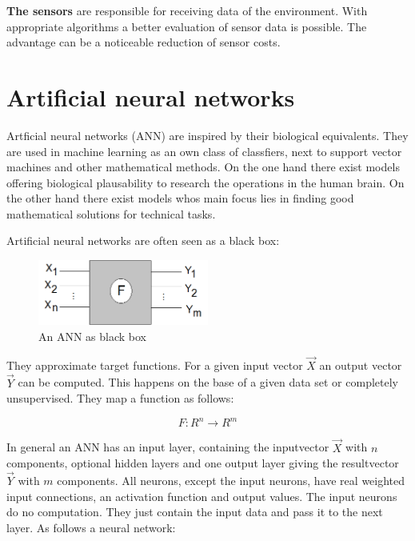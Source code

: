 \documentclass[10pt,a4paper,DIV=11]{scrreprt}
\begin{document}
\textbf{The sensors} are responsible for receiving data of the environment. With appropriate algorithms a better evaluation of sensor data is possible. The advantage can be a noticeable reduction of sensor costs.


\chapter{Artificial neural networks}
Artficial neural networks (ANN) are inspired by their biological equivalents.
They are used in machine learning as an own class of classfiers, next to support vector machines
and other mathematical methods. On the one hand there exist models offering biological plausability to research the
operations in the human brain. On the other hand there exist models whos main focus lies in finding good mathematical solutions for technical tasks.

Artificial neural networks are often seen as a black box: \\

\begin{center}
	\begin{figure}[H]
		\centering
		\includegraphics[width=0.5\textwidth,scale=1.0]{files/nn-bb.png}  
		\caption{An ANN as black box \cite{rojas}}
		\label{fig:neuron}
	\end{figure}
\end{center} 
They approximate target functions. For a given input vector $\vec{X}$ an output vector $\vec{Y}$ can be computed.
This happens on the base of a given data set or completely unsupervised.
They map a function as follows\cite{rojas}:

\begin{equation}
	F: R^n \to R^m 
\end{equation} 

In general an ANN has an input layer, containing the inputvector $\vec{X}$ with $n$ components, optional hidden layers and one output layer giving the resultvector $\vec{Y}$ with $m$ components.
All neurons, except the input neurons, have real weighted input connections, an activation function and output values. The input neurons do no computation. They just contain the input data and pass it to the next layer. As follows a neural network:
\end{document}
